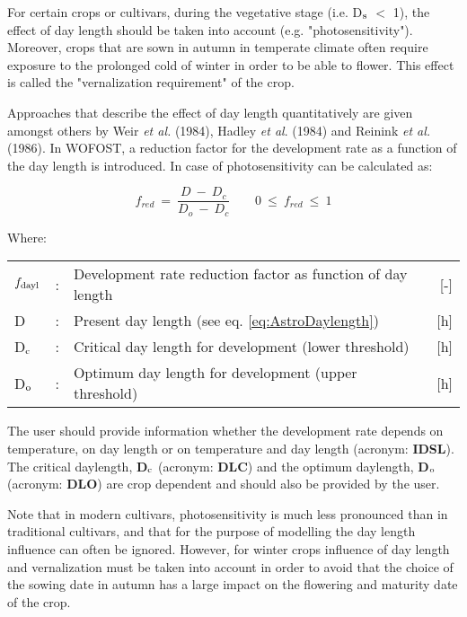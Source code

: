 For certain crops or cultivars, during the vegetative stage (i.e. D$_{{\rm s}}$ $<$ 1), the 
effect of day length should be taken into account (e.g. "photosensitivity"). Moreover, crops 
that are sown in autumn
in temperate climate often require exposure to the prolonged cold of winter in order to be
able to flower. This effect is called the "vernalization requirement" of the crop.

Approaches that describe the effect of day length 
quantitatively are given amongst others by  Weir {\it et al.} (1984), Hadley {\it et al}. (1984) 
and Reinink {\it et al.} (1986). In WOFOST, a reduction factor for the development rate as a 
function of the day length is introduced. In case of photosensitivity can be calculated as:

\begin{equation}
\label{eq:5.5}
f_{red} ~=~{\frac{D ~-~D _{c} }{D _{o} ~-~ D _{c} }} ~~~~~~~~~0~\le ~f _{red} ~\le ~1
\end{equation}

Where:\\[5pt]
\begin{tabularx}{\textwidth}{llXr}
	$f_{{\rm dayl}}$ &:& Development rate reduction factor as function of day length   &     [-]\\
	D &:& Present day length (see eq. \ref{eq:AstroDaylength})   &     [h]\\
	D$_{{\rm c}}$ &:& Critical day length for development (lower threshold)    &    [h]\\
	D$_{{\rm o}}$ &:& Optimum day length for development (upper threshold)    &    [h]\\
\end{tabularx}

The user should provide information whether the development rate depends on temperature, 
on day length or on temperature and day length (acronym: {\bf IDSL}). The critical
daylength, {\bf D$_{{\rm c}}$} (acronym: {\bf DLC}) and the optimum daylength, 
{\bf D$_{{\rm o}}$} (acronym: {\bf DLO}) are crop dependent and should also be provided by 
the user. 

Note that in modern cultivars, photosensitivity is much less pronounced than in traditional
cultivars, and that for the purpose of modelling the day length influence can often be ignored.
However, for winter crops influence of day length and vernalization must be taken into
account in order to avoid that the choice of the sowing date in autumn has a large impact on 
the flowering and maturity date of the crop.


